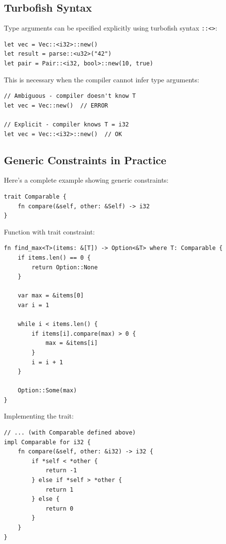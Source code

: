 \subsection{Turbofish Syntax}

Type arguments can be specified explicitly using turbofish syntax \texttt{::<>}:

\begin{lstlisting}
let vec = Vec::<i32>::new()
let result = parse::<u32>("42")
let pair = Pair::<i32, bool>::new(10, true)
\end{lstlisting}

This is necessary when the compiler cannot infer type arguments:

\begin{lstlisting}
// Ambiguous - compiler doesn't know T
let vec = Vec::new()  // ERROR

// Explicit - compiler knows T = i32
let vec = Vec::<i32>::new()  // OK
\end{lstlisting}

\subsection{Generic Constraints in Practice}

Here's a complete example showing generic constraints:

\begin{lstlisting}
trait Comparable {
    fn compare(&self, other: &Self) -> i32
}
\end{lstlisting}

Function with trait constraint:

\begin{lstlisting}
fn find_max<T>(items: &[T]) -> Option<&T> where T: Comparable {
    if items.len() == 0 {
        return Option::None
    }

    var max = &items[0]
    var i = 1

    while i < items.len() {
        if items[i].compare(max) > 0 {
            max = &items[i]
        }
        i = i + 1
    }

    Option::Some(max)
}
\end{lstlisting}

Implementing the trait:

\begin{lstlisting}
// ... (with Comparable defined above)
impl Comparable for i32 {
    fn compare(&self, other: &i32) -> i32 {
        if *self < *other {
            return -1
        } else if *self > *other {
            return 1
        } else {
            return 0
        }
    }
}
\end{lstlisting}

